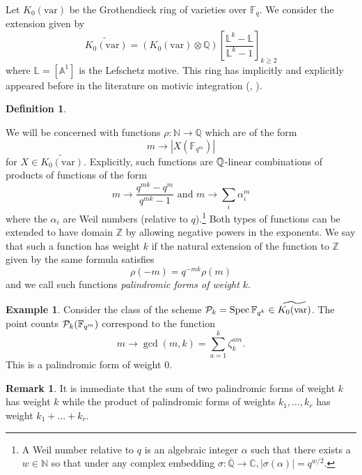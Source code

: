 \documentclass[10pt]{article}
\theoremstyle{plain}
\theoremstyle{definition}
\newtheorem{definition}[theorem]{Definition}
\newtheorem{example}[theorem]{Example}
\newtheorem{remark}[theorem]{Remark}
\numberwithin{equation}{section}
\begin{document}
Let $K_0(\mathrm{var})$ be the Grothendieck ring of varieties over $\mathbb F_q$. We consider the extension given by 
\[\widetilde{K_0(\mathrm{var})} = \left(K_0(\mathrm{var})\otimes\mathbb Q\right)\left[\frac{\mathbb L^k - \mathbb L}{\mathbb L^{k}-1}\right]_{k\geq 2}\]
where $\mathbb L = [\mathbb A^1]$ is the Lefschetz motive. This ring has implicitly and explicitly appeared before in the literature on motivic integration (\cite{denef1991functional}, \cite[\S 7]{denef_loeser_2000}).

\begin{definition}\label{defn: palindromic forms}

We will be concerned with functions $\rho: \mathbb N \to \mathbb Q$ which are of the form
\[m \to |X(\mathbb F_{q^m})|\]
for $X \in \widetilde{K_0(\mathrm{var})}$. Explicitly, such functions are ${\mathbb Q}$-linear combinations of products of functions of the form
\[m \to \frac{q^{mk}-q^m}{q^{mk}-1} \text{ and } m \to \sum_{i}\alpha_{i}^m\]
where the $\alpha_i$ are Weil numbers (relative to $q$).\footnote{A Weil number relative to $q$ is an algebraic integer $\alpha$ such that there exists a $w \in \mathbb N$ so that under any complex embedding $\sigma: \overline{\mathbb Q} \to \mathbb C, |\sigma(\alpha)| = q^{w/2}$.} 
Both types of functions can be extended to have domain $\mathbb Z$ by allowing negative powers in the exponents. We say that such a function has weight $k$ if the natural extension of the function to $\mathbb Z$ given by the same formula satisfies
\[\rho(-m) = q^{-mk}\rho(m)\]
and we call such functions \emph{palindromic forms of weight $k$}.
\end{definition}

\begin{example}\label{ex: roots of untiy are palindromic forms}
Consider the class of the scheme ${\mathcal P}_k = \operatorname{Spec} \mathbb F_{q^k} \in \widetilde{K_0(\mathrm{var})}$. The point counts ${\mathcal P}_k(\mathbb F_{q^m})$ correspond to the function
\[m \to \gcd(m,k) = \sum_{a=1}^k\zeta_{k}^{am}.\]
This is a palindromic form of weight $0$.
\end{example}

\begin{remark}\label{rmk: palindromic forms closed under sums and products}
It is immediate that the sum of two palindromic forms of weight $k$ has weight $k$ while the product of palindromic forms of weights $k_1,\dots,k_r$ has weight $k_1+\dots+k_r$.
\end{remark}
\end{document}
